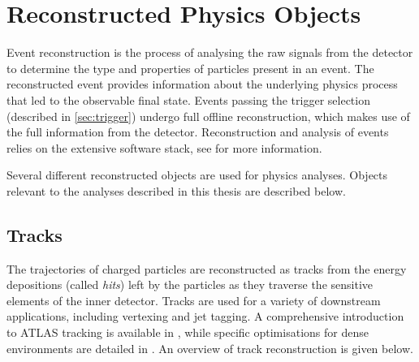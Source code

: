 









\section{Reconstructed Physics Objects}\label{sec:physics-objects}

Event reconstruction is the process of analysing the raw signals from the detector to determine the type and properties of particles present in an event. 
The reconstructed event provides information about the underlying physics process that led to the observable final state. 
Events passing the trigger selection (described in \cref{sec:trigger}) undergo full offline reconstruction, which makes use of the full information from the detector.
Reconstruction and analysis of events relies on the extensive \ATLAS software stack, see  for more information.

Several different reconstructed objects are used for physics analyses.
Objects relevant to the analyses described in this thesis are described below.



\subsection{Tracks}\label{sec:track_reco}
The trajectories of charged particles are reconstructed as tracks from the energy depositions (called \textit{hits}) left by the particles as they traverse the sensitive elements of the inner detector.
Tracks are used for a variety of downstream applications, including vertexing and jet tagging.
A comprehensive introduction to ATLAS tracking is available in \cite{Cornelissen:2007vba}, while specific optimisations for dense environments are detailed in \cite{ATL-PHYS-PUB-2015-006, PERF-2015-08}.
An overview of track reconstruction is given below.

